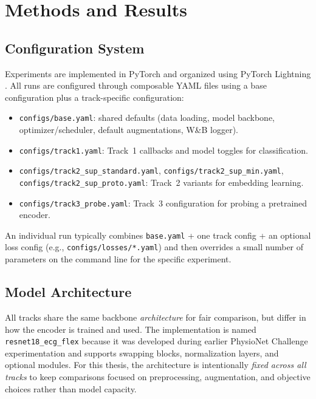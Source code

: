 \chapter{Methods and Results}
\label{ch:methods-results}

\section{Configuration System}
Experiments are implemented in PyTorch \parencite{pytorch_2019} and organized using PyTorch Lightning \parencite{pytorch_lightning_2025}.
All runs are configured through composable YAML files using a base configuration plus a track-specific configuration:
\begin{itemize}
  \setlength{\itemsep}{0.1\baselineskip}
  \setlength{\topsep}{0.25\baselineskip}
  \setlength{\partopsep}{0pt}
  \setlength{\parskip}{0pt}
  \setlength{\parsep}{0pt}
  \item \texttt{configs/base.yaml}: shared defaults (data loading, model backbone, optimizer/scheduler, default augmentations, W\&B logger).
  \item \texttt{configs/track1.yaml}: Track~1 callbacks and model toggles for classification.
  \item \texttt{configs/track2\_sup\_standard.yaml}, \texttt{configs/track2\_sup\_min.yaml}, \texttt{configs/track2\_sup\_proto.yaml}: Track~2 variants for embedding learning.
  \item \texttt{configs/track3\_probe.yaml}: Track~3 configuration for probing a pretrained encoder.
\end{itemize}
An individual run typically combines \texttt{base.yaml} + one track config + an optional loss config (e.g., \texttt{configs/losses/*.yaml}) and then overrides a small number of parameters on the command line for the specific experiment.

\section{Model Architecture}

All tracks share the same backbone \emph{architecture} for fair comparison, but differ in how the encoder is trained and used.
The implementation is named \texttt{resnet18\_ecg\_flex} because it was developed during earlier PhysioNet Challenge experimentation and supports swapping blocks, normalization layers, and optional modules.
For this thesis, the architecture is intentionally \emph{fixed across all tracks} to keep comparisons focused on preprocessing, augmentation, and objective choices rather than model capacity.

